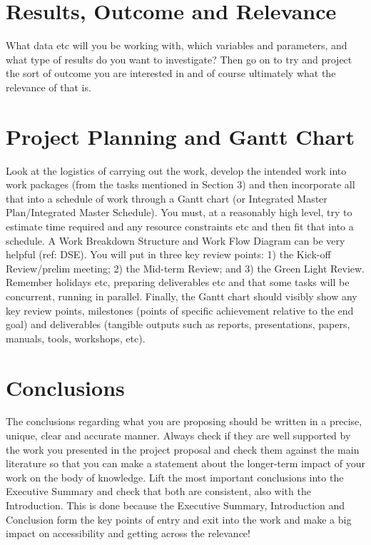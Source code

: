 \documentclass{article}
\begin{document}
\section{Results, Outcome and Relevance}
\label{sec:result}

What data etc will you be working with, which variables and parameters, and what type of results do you want to investigate? Then go on to try and project the sort of outcome you are interested in and of course ultimately what the relevance of that is.

\section{Project Planning and Gantt Chart}
\label{sec:planning}

Look at the logistics of carrying out the work, develop the intended work into work packages (from the tasks mentioned in Section 3) and then incorporate all that into a schedule of work through a Gantt chart (or Integrated Master Plan/Integrated Master Schedule). You must, at a reasonably high level, try to estimate time required and any resource constraints etc and then fit that into a schedule. A Work Breakdown Structure and Work Flow Diagram can be very helpful (ref: DSE). You will put in three key review points: 1) the Kick-off Review/prelim meeting; 2) the Mid-term Review; and 3) the Green Light Review.
Remember holidays etc, preparing deliverables etc and that some tasks will be concurrent, running in parallel. Finally, the Gantt chart should visibly show any key review points, milestones (points of specific achievement relative to the end goal) and deliverables (tangible outputs such as reports, presentations, papers, manuals, tools, workshops, etc).

\section{Conclusions}
\label{sec:conclusions}

The conclusions regarding what you are proposing should be written in a precise, unique, clear and accurate manner. Always check if they are well supported by the work you presented in the project proposal and check them against the main literature so that you can make a statement about the longer-term impact of your work on the body of knowledge. Lift the most important conclusions into the Executive Summary and check that both are consistent, also with the Introduction. This is done because the Executive Summary, Introduction and Conclusion form the key points of entry and exit into the work and make a big impact on accessibility and getting across the relevance!
\end{document}
